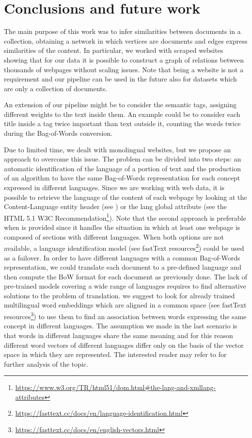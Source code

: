 \chapter{Conclusions and future work} \label{conclusions}
The main purpose of this work was to infer
 similarities between documents in a collection,
obtaining a network in which vertices are documents and
edges express similarities of the content.
In particular, we worked with scraped websites
showing that for our data it is possible to construct
a graph of relations between thousands of webpages
without scaling issues. 
Note that being a website is not a requirement and 
our pipeline can be used in the future also for 
datasets which are only a collection of documents.

An extension of our pipeline might be to consider the semantic tags, 
assigning different weights to the text inside them. 
An example could be to consider each title inside a  
tag twice important than text outside it, 
counting the words twice during the Bag-of-Words conversion.

Due to limited time, we dealt with monolingual
websites, but we propose an approach to overcome this issue.
The problem can be divided into two steps:
an automatic identification of the language of a portion of text and
the production of an algorithm to have the same Bag-of-Words
representation for each concept expressed in different languages.
Since we are working with web data, it is possible to retrieve the language
of the content of each webpage by looking at the Content-Language entity header
(see \cite{rfc7231}) or the lang global attribute
(see the HTML 5.1 W3C Recommendation\footnote{\url{https://www.w3.org/TR/html51/dom.html\#the-lang-and-xmllang-attributes}}).
Note that the second approach is preferable when  is provided
since it handles the situation in which at least
one webpage is composed of sections with different languages.
When both options are not available,
a language identification model
(see fastText resources\footnote{\url{https://fasttext.cc/docs/en/language-identification.html}})
could be used as a failover.
In order to have different languages with a common Bag-of-Words
representation, we could translate each document to a pre-defined language
and then compute the BoW format for each document as previously done.
The lack of pre-trained models covering a wide range
of languages requires to find alternative solutions to the problem of translation.
we suggest to look for already trained multilingual word embeddings
which are aligned in a common space (see fastText resources\footnote{\url{https://fasttext.cc/docs/en/english-vectors.html}})
to use them to find an association between words expressing the same concept in different languages.
The assumption we made in the last scenario is that words in different languages share
the same meaning and for this reason different word vectors of different languages differ only on the basis
of the vector space in which they are represented.
The interested reader may refer to \cite{DBLP:journals/corr/abs-1804-07745} for further analysis of the topic.


